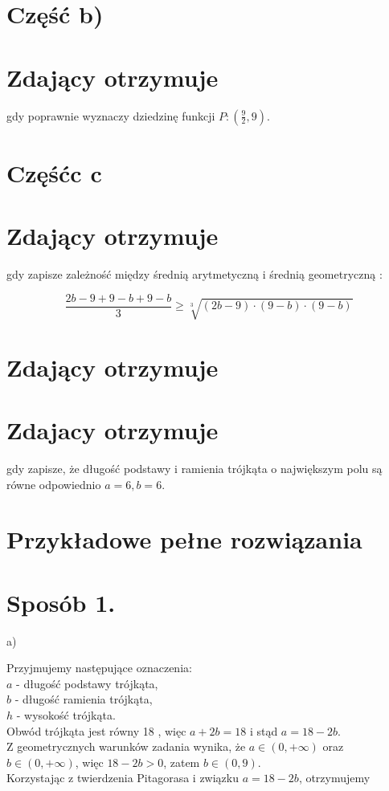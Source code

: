 \documentclass[10pt]{article}
\begin{document}
\section*{Część b)}
\section*{Zdający otrzymuje}
gdy poprawnie wyznaczy dziedzinę funkcji $P:\left(\frac{9}{2}, 9\right)$.

\section*{Częśćc $\mathbf{c}$}
\section*{Zdający otrzymuje}
gdy zapisze zależność między średnią arytmetyczną i średnią geometryczną :

$$
\frac{2 b-9+9-b+9-b}{3} \geq \sqrt[3]{(2 b-9) \cdot(9-b) \cdot(9-b)}
$$

\section*{Zdający otrzymuje}
\section*{Zdajacy otrzymuje}
gdy zapisze, że długość podstawy i ramienia trójkąta o największym polu są równe odpowiednio $a=6, b=6$.

\section*{Przykładowe pełne rozwiązania}
\section*{Sposób 1.}
a)

Przyjmujemy następujące oznaczenia:\\
$a$ - długość podstawy trójkąta,\\
$b$ - długość ramienia trójkąta,\\
$h$ - wysokość trójkąta.\\
Obwód trójkąta jest równy 18 , więc $a+2 b=18$ i stąd $a=18-2 b$.\\
Z geometrycznych warunków zadania wynika, że $a \in(0,+\infty)$ oraz $b \in(0,+\infty)$, więc $18-2 b>0$, zatem $b \in(0,9)$.\\
Korzystając z twierdzenia Pitagorasa i związku $a=18-2 b$, otrzymujemy
\end{document}
